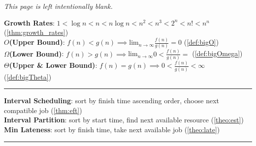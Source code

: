 \vfill

\begin{center}
\textit{This page is left intentionally blank.}
\end{center}
\vfill
\newpage

\noindent
\textbf{Growth Rates}: $1 < \log n < n < n \log n < n^2 < n^3 < 2^n < n! < n^n$ (\ref{thm:growth_rates})\\
\textbf{$O$(Upper Bound)}: $f(n) < g(n)\implies $lim$_{n\to\infty}\frac{f(n)}{g(n)}=0$ (\ref{def:bigO})\\
\textbf{$\Omega$(Lower Bound)}: $f(n) > g(n)\implies $lim$_{n\to\infty}0<\frac{f(n)}{g(n)}=$ (\ref{def:bigOmega})\\
\textbf{$\Theta$(Upper \& Lower Bound)}: $f(n) = g(n)\implies 0<\frac{f(n)}{g(n)}<\infty$ (\ref{def:bigTheta})\\
\noindent\rule{\textwidth}{0.4pt}
\textbf{Interval Scheduling}: sort by finish time ascending order, choose next compatible job (\ref{thm:eft})\\
\textbf{Interval Partition}: sort by start time, find next available resource (\ref{theo:est})\\
\textbf{Min Lateness}: sort by finish time, take next available job (\ref{theo:late})\\
\noindent\rule{\textwidth}{0.4pt}

\vspace{.5em}
\noindent

